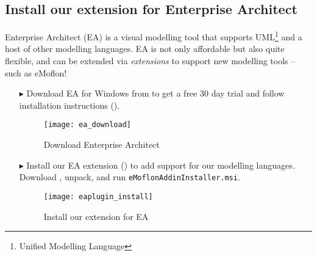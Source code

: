 \newpage

\genHeader
\subsection{Install our extension for Enterprise Architect}

Enterprise Architect (EA) is a visual modelling tool that supports UML\footnote{Unified Modelling Language} and a host of other modelling languages.
EA is not only affordable but also quite flexible, and can be extended via \emph{extensions} to support new modelling tools -- such as eMoflon!

\begin{itemize}
\item[$\blacktriangleright$] Download\hypertarget{installEA vis}{} EA for Windows from  to get a free 30 day trial and follow
installation instructions ().

\begin{figure}[htbp]
	\centering
  	\texttt{[image: ea\_download]}
	\caption{Download Enterprise Architect}
	\label{enterpriseArchitextHomepage}
\end{figure} 

\item[$\blacktriangleright$] Install our EA extension () to add support for our modelling languages.
Download \eMoflonEAAddin, unpack, and run \texttt{eMoflon\-Addin\-Installer.msi}.

\begin{figure}[htbp]
	\centering
  \texttt{[image: eaplugin\_install]}
	\caption{Install our extension for EA}
	\label{eaPluginWizard}
\end{figure}
\end{itemize}
